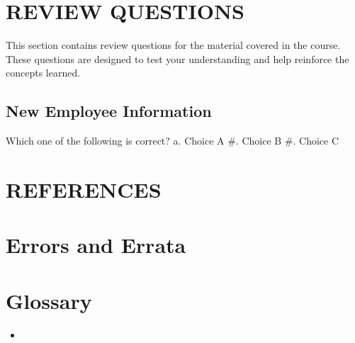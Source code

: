 \documentclass[letterpaper,10pt,english]{sphinxmanual}
\begin{document}
\chapter{REVIEW QUESTIONS}
\label{\detokenize{review_questions:review-questions}}\label{\detokenize{review_questions::doc}}
\sphinxAtStartPar
This section contains review questions for the material covered in the course. These questions are designed to test your understanding and help reinforce the concepts learned.


\section{New Employee Information}
\label{\detokenize{review_questions:new-employee-information}}
\sphinxAtStartPar
Which one of the following is correct?
a. Choice A
\#. Choice B
\#. Choice C

\sphinxstepscope


\chapter{REFERENCES}
\label{\detokenize{references:references}}\label{\detokenize{references::doc}}
\sphinxstepscope


\chapter{Errors and Errata}
\label{\detokenize{errata:errors-and-errata}}\label{\detokenize{errata::doc}}

\chapter{Glossary}
\label{\detokenize{index:glossary}}\begin{itemize}
\item {} 
\sphinxAtStartPar
{}

\end{itemize}



\renewcommand{\indexname}{Index}
\printindex
\end{document}
